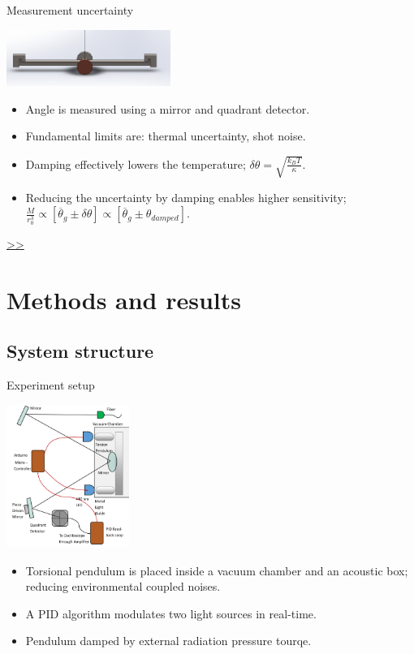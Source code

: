 \documentclass{beamer}
\begin{document}
\begin{frame}{\hypertarget{frame:Measurement uncertainty}{Measurement uncertainty}}
	\begin{center}		
		\includegraphics[width=0.4\textwidth,keepaspectratio]{pendulum_front.png}
    \end{center}
	\begin{itemize}
		
		\item Angle is measured using a mirror and quadrant detector.
		\item Fundamental limits are: thermal uncertainty, shot noise. 
		\item Damping effectively lowers the temperature; $\delta\theta = \sqrt{\frac{k_B T}{\kappa}}$. 
		\item Reducing the uncertainty by damping enables higher sensitivity; $\frac{M}{r_0^3} \propto [\overline{\theta}_g\pm \delta\theta] \propto [\overline{\theta}_g\pm \theta_{damped}]$.

		
	\end{itemize}
	\hyperlink{frame:Measurement uncertainty 1}{>>} 
\end{frame}
\section{Methods and results}
\subsection{System structure}
\begin{frame}{Experiment setup}
	\begin{center}		
			\includegraphics[width=0.3\textwidth,keepaspectratio]{setup cropped.png}
	\end{center}
	\begin{itemize}
		\item Torsional pendulum is placed inside a vacuum chamber and an acoustic box; reducing environmental coupled noises.
		\item A PID algorithm modulates two light sources in real-time.
		\item Pendulum damped by external radiation pressure tourqe.
	
	\end{itemize}
	
\end{frame}
\end{document}
